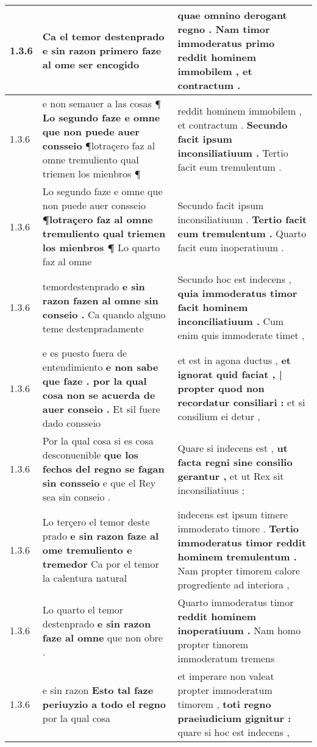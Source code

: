 \begin{tabular}{|p{1cm}|p{6.5cm}|p{6.5cm}|}
1.3.6 & Ca el temor destenprado \textbf{ e sin razon primero faze } al ome ser encogido & quae omnino derogant regno . \textbf{ Nam timor immoderatus primo } reddit hominem immobilem , et contractum . \\\hline
1.3.6 & e non semauer a las cosas ¶ \textbf{ Lo segundo faze e omne que non puede auer consseio } ¶lotraçero faz al omne tremuliento qual triemen los mienbros ¶ & reddit hominem immobilem , et contractum . \textbf{ Secundo facit ipsum inconsiliatiuum . } Tertio facit eum tremulentum . \\\hline
1.3.6 & Lo segundo faze e omne que non puede auer consseio \textbf{ ¶lotraçero faz al omne tremuliento qual triemen los mienbros ¶ } Lo quarto faz al omne & Secundo facit ipsum inconsiliatiuum . \textbf{ Tertio facit eum tremulentum . } Quarto facit eum inoperatiuum . \\\hline
1.3.6 & temordestenprado \textbf{ e sin razon fazen al omne sin conseio . } Ca quando alguno teme destenpradamente & Secundo hoc est indecens , \textbf{ quia immoderatus timor facit hominem inconciliatiuum . } Cum enim quis immoderate timet , \\\hline
1.3.6 & e es puesto fuera de entendimiento \textbf{ e non sabe que faze . por la qual cosa non se acuerda de auer conseio . } Et sil fuere dado consseio & et est in agona ductus , \textbf{ et ignorat quid faciat , | propter quod non recordatur consiliari : } et si consilium ei detur , \\\hline
1.3.6 & Por la qual cosa si es cosa desconuenible \textbf{ que los fechos del regno se fagan sin consseio } e que el Rey sea sin conseio . & Quare si indecens est , \textbf{ ut facta regni sine consilio gerantur , } et ut Rex sit inconsiliatiuus ; \\\hline
1.3.6 & Lo terçero el temor deste prado \textbf{ e sin razon faze al ome tremuliento e tremedor } Ca por el temor la calentura natural & indecens est ipsum timere immoderato timore . \textbf{ Tertio immoderatus timor reddit hominem tremulentum . } Nam propter timorem calore progrediente ad interiora , \\\hline
1.3.6 & Lo quarto el temor destenprado \textbf{ e sin razon faze al omne } que non obre . & Quarto immoderatus timor \textbf{ reddit hominem inoperatiuum . } Nam homo propter timorem immoderatum tremens \\\hline
1.3.6 & e sin razon \textbf{ Esto tal faze periuyzio a todo el regno } por la qual cosa & et imperare non valeat propter immoderatum timorem , \textbf{ toti regno praeiudicium gignitur : } quare si hoc est indecens , \\\hline

\end{tabular}

